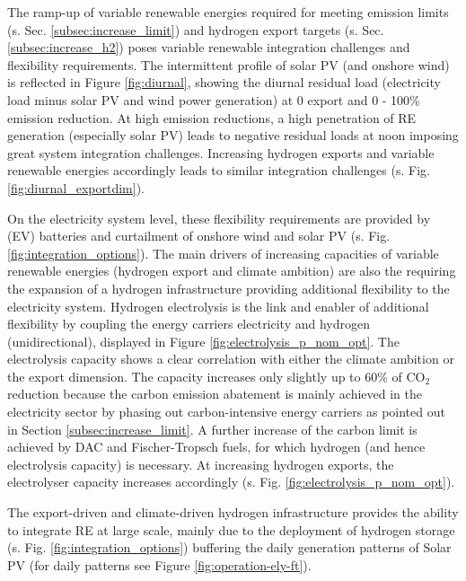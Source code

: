 The ramp-up of variable renewable energies required for meeting emission limits (s. Sec. \ref{subsec:increase_limit}) and hydrogen export targets (s. Sec. \ref{subsec:increase_h2}) poses variable renewable integration challenges and flexibility requirements.
The intermittent profile of solar PV (and onshore wind) is reflected in Figure \ref{fig:diurnal}, showing the diurnal residual load (electricity load minus solar PV and wind power generation) at 0 export and 0 - 100\% emission reduction. At high emission reductions, a high penetration of RE generation (especially solar PV) leads to negative residual loads at noon imposing great system integration challenges. 
Increasing hydrogen exports and variable renewable energies accordingly leads to similar integration challenges (s. Fig. \ref{fig:diurnal_exportdim}).

On the electricity system level, these flexibility requirements are provided by (EV) batteries and curtailment of onshore wind and solar PV (s. Fig. \ref{fig:integration_options}). %
The main drivers of increasing capacities of variable renewable energies (hydrogen export and climate ambition) are also the requiring the expansion of a hydrogen infrastructure providing additional flexibility to the electricity system. Hydrogen electrolysis is the link and enabler of additional flexibility by coupling the energy carriers electricity and hydrogen (unidirectional), displayed in Figure \ref{fig:electrolysis_p_nom_opt}. The electrolysis capacity shows a clear correlation with either the climate ambition or the export dimension. The capacity increases only slightly up to 60\% of $\mathrm{CO_2}$ reduction because the carbon emission abatement is mainly achieved in the electricity sector by phasing out carbon-intensive energy carriers as pointed out in Section \ref{subsec:increase_limit}. A further increase of the carbon limit is achieved by DAC and Fischer-Tropsch fuels, for which hydrogen (and hence electrolysis capacity) is necessary. At increasing hydrogen exports, the electrolyser capacity increases accordingly (s. Fig. \ref{fig:electrolysis_p_nom_opt}).

The export-driven and climate-driven hydrogen infrastructure provides the ability to integrate RE at large scale, mainly due to the deployment of hydrogen storage (s. Fig. \ref{fig:integration_options}) buffering the daily generation patterns of Solar PV (for daily patterns see Figure \ref{fig:operation-ely-ft}).



